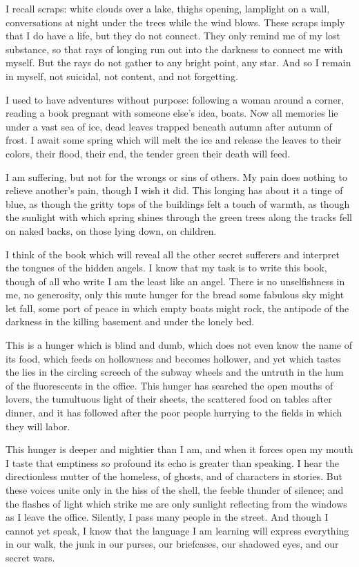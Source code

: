 \documentclass[english,11pt,letterpaper,onecolumn]{scrbook}
\begin{document}
	I recall scraps:  white clouds over a lake, thighs opening, lamplight on a wall, conversations at night under the trees while the wind blows.  These scraps imply that I do have a life, but they do not connect.  They only remind me of my lost substance, so that rays of longing run out into the darkness to connect me with myself.  But the rays do not gather to any bright point, any star.  And so I remain in myself, not suicidal, not content, and not forgetting.

	I used to have adventures without purpose:  following a woman around a corner, reading a book pregnant with someone else's idea, boats.  Now all memories lie under a vast sea of ice, dead leaves trapped beneath autumn after autumn of frost.  I await some spring which will melt the ice and release the leaves to their colors, their flood, their end, the tender green their death will feed.

	I am suffering, but not for the wrongs or sins of others.  My pain does nothing to relieve another's pain, though I wish it did.  This longing has about it a tinge of blue, as though the gritty tops of the buildings felt a touch of warmth, as though the sunlight with which spring shines through the green trees along the tracks fell on naked backs, on those lying down, on children.

	I think of the book which will reveal all the other secret sufferers and interpret the tongues of the hidden angels.  I know that my task is to write this book, though of all who write I am the least like an angel.  There is no unselfishness in me, no generosity, only this mute hunger for the bread some fabulous sky might let fall, some port of peace in which empty boats might rock, the antipode of the darkness in the killing basement and under the lonely bed.

	This is a hunger which is blind and dumb, which does not even know the name of its food, which feeds on hollowness and becomes hollower, and yet which tastes the lies in the circling screech of the subway wheels and the untruth in the hum of the fluorescents in the office.  This hunger has searched the open mouths of lovers, the tumultuous light of their sheets, the scattered food on tables after dinner, and it has followed after the poor people hurrying to the fields in which they will labor.

	This hunger is deeper and mightier than I am, and when it forces open my mouth I taste that emptiness so profound its echo is greater than speaking.  I hear the directionless mutter of the homeless, of ghosts, and of characters in stories.  But these voices unite only in the hiss of the shell, the feeble thunder of silence; and the flashes of light which strike me are only sunlight reflecting from the windows as I leave the office.  Silently, I pass many people in the street.  And though I cannot yet speak, I know that the language I am learning will express everything in our walk, the junk in our purses, our briefcases, our shadowed eyes, and our secret wars.
\end{document}
